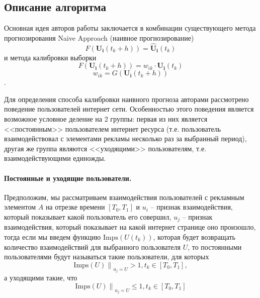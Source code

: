 \documentclass[a4paper, 14pt]{extreport}
\begin{document}
    \subsection*{Описание алгоритма}

    Основная идея авторов работы заключается в комбинации существующего метода прогнозирования Naive Approach (наивное
    прогнозирование)
    \begin{equation}
        F\left( \mathbf{U_i}\left(t_k + h \right) \right)
        = \mathbf{\widehat{U}_i}\left(t_k\right)
    \end{equation}
    и метода калибровки выборки
    \begin{equation}
        F\left( \mathbf{U_i}\left(t_k + h \right) \right)
        = w_{ik} \cdot \mathbf{{U}_i}\left(t_k\right)
    \end{equation}
    \begin{equation}
        w_{ik} = G\left( \mathbf{U_i}\left(t_k + h \right) \right)
    \end{equation}.

    Для определения способа калибровки наивного прогноза авторами рассмотрено поведение пользователей интернет сети.
    Особенностью этого поведения является возможное условное деление на 2 группы: первая из них является <<постоянным>>
    пользователем интернет ресурса (т.е. пользователь взаимодействовал с элементами рекламы несколько раз за выбранный
    период), другая же группа являются <<уходящими>> пользователям, т.е. взаимодействующими единожды.

    \paragraph{Постоянные и уходящие пользователи.} Предположим, мы рассматриваем взаимодействия пользователей с
    рекламным элементом $A$ на отрезке времени $\left[ T_0, T_1 \right]$ и $u_i$ -- признак взаимодействия,
    который показывает какой пользователь его совершил, $u_j$ -- признак взаимодействия, который показывает на какой
    интернет странице оно произошло, тогда если мы введем функцию $\text{Imps}\left(U\left(t_k\right)\right)$, которая
    будет возвращать количество взаимодействий для выбранного пользователя $U$, то постоянными пользователями будут
    называться такие пользователи, для которых
    \begin{equation}
        \left.\text{Imps}\left(U\right)\right\|_{u_j = U} > 1, t_k \in \left[ T_0, T_1 \right],
    \end{equation}
    а уходящими такие, что
    \begin{equation}
        \left.\text{Imps}\left(U\right)\right\|_{u_j = U} \leq 1, t_k \in \left[ T_0, T_1 \right]
    \end{equation}
\end{document}
